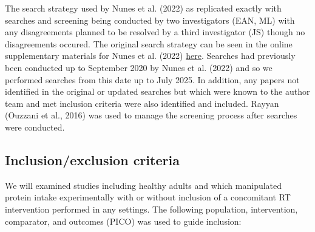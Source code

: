 \documentclass[
]{article}
\begin{document}
The search strategy used by Nunes et al. (2022) as replicated exactly
with searches and screening being conducted by two investigators (EAN,
ML) with any disagreements planned to be resolved by a third
investigator (JS) though no disagreements occured. The original search
strategy can be seen in the online supplementary materials for Nunes et
al. (2022)
\href{https://onlinelibrary.wiley.com/action/downloadSupplement?doi=10.1002\%2Fjcsm.12922&file=jcsm12922-sup-0005-Search_strategies_.pdf}{here}.
Searches had previously been conducted up to September 2020 by Nunes et
al. (2022) and so we performed searches from this date up to July 2025.
In addition, any papers not identified in the original or updated
searches but which were known to the author team and met inclusion
criteria were also identified and included. Rayyan (Ouzzani et al.,
2016) was used to manage the screening process after searches were
conducted.

\subsection{Inclusion/exclusion
criteria}\label{inclusionexclusion-criteria}

We will examined studies including healthy adults and which manipulated
protein intake experimentally with or without inclusion of a concomitant
RT intervention performed in any settings. The following population,
intervention, comparator, and outcomes (PICO) was used to guide
inclusion:
\end{document}
